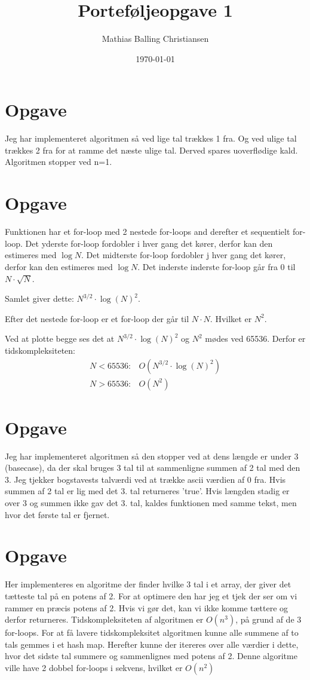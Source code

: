 \documentclass{article}
\title{Porteføljeopgave 1}
\author{Mathias Balling Christiansen}
\date{\today}
\begin{document}
\maketitle
\tableofcontents
\newpage

\section{Opgave} %
Jeg har implementeret algoritmen så ved lige tal trækkes 1 fra. 
Og ved ulige tal trækkes 2 fra for at ramme det næste ulige tal.
Derved spares uoverflødige kald. Algoritmen stopper ved n=1.

\section{Opgave} %
Funktionen har et for-loop med 2 nestede for-loops and derefter et sequentielt
for-loop.
Det yderste for-loop fordobler i hver gang det kører, derfor kan den
estimeres med $\log{N}$.
Det midterste for-loop fordobler j hver gang det kører, derfor kan den
estimeres med $\log{N}$.
Det inderste inderste for-loop går fra 0 til $N\cdot\sqrt{N}$. 

Samlet giver dette: $N^{3/2}\cdot\log{(N)}^2$.

Efter det nestede for-loop er et for-loop der går til $N\cdot N$. Hvilket
er $N^2$.

Ved at plotte begge ses det at $N^{3/2}\cdot\log{(N)}^2$ og $N^2$
mødes ved 65536. Derfor er tidskompleksiteten:
$$
\begin{array}{cl}
  N<65536: & O(N^{3/2}\cdot\log{(N)}^2)\\
  N>65536: & O(N^2)
\end{array}
$$


\section{Opgave} %
Jeg har implementeret algoritmen så den stopper ved at dens længde er under 3 (basecase),
da der skal bruges 3 tal til at sammenligne summen af 2 tal med den 3.
Jeg tjekker bogstavests talværdi ved at trække ascii værdien af 0 fra.
Hvis summen af 2 tal er lig med det 3. tal returneres 'true'.
Hvis længden stadig er over 3 og summen ikke gav det 3. tal,
kaldes funktionen med samme tekst, men hvor det første tal er fjernet.

\section{Opgave} %
Her implementeres en algoritme der finder hvilke 3 tal i et array,
der giver det tætteste tal på en potens af 2.
For at optimere den har jeg et tjek der ser om vi rammer en præcis
potens af 2. Hvis vi gør det, kan vi ikke komme tættere og derfor returneres.
Tidskompleksiteten af algoritmen er $O(n^3)$, på grund af de 3 for-loops.
For at få lavere tidskompleksitet algoritmen kunne alle summene af 
to tals gemmes i et hash map. Herefter kunne der itereres over alle
værdier i dette, hvor det sidste tal summere og sammenlignes med potens af 2.
Denne algoritme ville have 2 dobbel for-loops i sekvens, hvilket er $O(n^2)$
\end{document}
